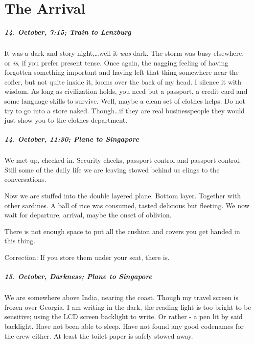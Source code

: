 \chapter{The Arrival}


\paragraph{14. October, 7:15; Train to Lenzburg}
It was a dark and story night,\ldots well it \emph{was} dark.
The storm was busy elsewhere, or \emph{is}, if you prefer present tense.
Once again, the nagging feeling of having forgotten something important and having left that thing somewhere near the coffer, but not quite inside it, looms over the back of my head.
I silence it with wisdom.
As long as civilization holds, you need but a passport, a credit card and some language skills to survive.
Well, maybe a clean set of clothes helps.
Do not try to go into a store naked.
Though\ldots if they are real businesspeople they would just show you to the clothes department.

\paragraph{14. October, 11:30; Plane to Singapore}
We met up, checked in.
Security checks, passport control and passport control.
Still some of the daily life we are leaving stowed behind us clings to the conversations.

Now we are stuffed into the double layered plane.
Bottom layer.
Together with other sardines.
A ball of rice was consumed, tasted delicious but fleeting.
We now wait for departure, arrival, maybe the onset of oblivion.

There is not enough space to put all the cushion and covers you get handed in this thing.

Correction: If you store them under your seat, there is.

\paragraph{15. October, Darkness; Plane to Singapore}
We are somewhere above India, nearing the coast.
Though my travel screen is frozen over Georgia.
I am writing in the dark, the reading light is too bright to be sensitive; using the LCD screen backlight to write.
Or rather - a pen lit by said backlight.
Have not been able to sleep.
Have not found any good codenames for the crew either.
At least the toilet paper is safely stowed away.

